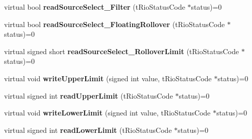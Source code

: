 \begin{DoxyCompactItemize}
\item 
\hypertarget{classnFPGA_1_1nFRC__2012__1__6__4_1_1tAnalogTrigger_ad7dd51f87101555af1ab379e8393aa50}{
virtual bool {\bfseries readSourceSelect\_\-Filter} (tRioStatusCode $\ast$status)=0}
\label{classnFPGA_1_1nFRC__2012__1__6__4_1_1tAnalogTrigger_ad7dd51f87101555af1ab379e8393aa50}

\item 
\hypertarget{classnFPGA_1_1nFRC__2012__1__6__4_1_1tAnalogTrigger_a629c929a177855fc423429bf69fb5b91}{
virtual bool {\bfseries readSourceSelect\_\-FloatingRollover} (tRioStatusCode $\ast$status)=0}
\label{classnFPGA_1_1nFRC__2012__1__6__4_1_1tAnalogTrigger_a629c929a177855fc423429bf69fb5b91}

\item 
\hypertarget{classnFPGA_1_1nFRC__2012__1__6__4_1_1tAnalogTrigger_a8591c519caf58876c25a082796bc1e97}{
virtual signed short {\bfseries readSourceSelect\_\-RolloverLimit} (tRioStatusCode $\ast$status)=0}
\label{classnFPGA_1_1nFRC__2012__1__6__4_1_1tAnalogTrigger_a8591c519caf58876c25a082796bc1e97}

\item 
\hypertarget{classnFPGA_1_1nFRC__2012__1__6__4_1_1tAnalogTrigger_a895a831716ca9b48eae344771d5f3fa5}{
virtual void {\bfseries writeUpperLimit} (signed int value, tRioStatusCode $\ast$status)=0}
\label{classnFPGA_1_1nFRC__2012__1__6__4_1_1tAnalogTrigger_a895a831716ca9b48eae344771d5f3fa5}

\item 
\hypertarget{classnFPGA_1_1nFRC__2012__1__6__4_1_1tAnalogTrigger_a754a8c15ccb43787b38e53c7245cd36c}{
virtual signed int {\bfseries readUpperLimit} (tRioStatusCode $\ast$status)=0}
\label{classnFPGA_1_1nFRC__2012__1__6__4_1_1tAnalogTrigger_a754a8c15ccb43787b38e53c7245cd36c}

\item 
\hypertarget{classnFPGA_1_1nFRC__2012__1__6__4_1_1tAnalogTrigger_abaeb199c22a8f1bb575f819660c5f356}{
virtual void {\bfseries writeLowerLimit} (signed int value, tRioStatusCode $\ast$status)=0}
\label{classnFPGA_1_1nFRC__2012__1__6__4_1_1tAnalogTrigger_abaeb199c22a8f1bb575f819660c5f356}

\item 
\hypertarget{classnFPGA_1_1nFRC__2012__1__6__4_1_1tAnalogTrigger_a407b96e4898151162b0208b42a91735c}{
virtual signed int {\bfseries readLowerLimit} (tRioStatusCode $\ast$status)=0}
\label{classnFPGA_1_1nFRC__2012__1__6__4_1_1tAnalogTrigger_a407b96e4898151162b0208b42a91735c}


\end{DoxyCompactItemize}
